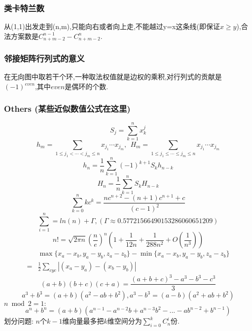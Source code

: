 \begin{small}
\subsubsection{类卡特兰数}
从(1,1)出发走到(n,m),只能向右或者向上走,不能越过y=x这条线(即保证$x\geq y$),合法方案数是$C_{n+m-2}^{n-1} - C_{n+m-2}^n$.

\subsubsection{邻接矩阵行列式的意义}
在无向图中取若干个环,一种取法权值就是边权的乘积,对行列式的贡献是$(-1)^{even}$,其中$even$是偶环的个数.

\subsubsection{Others (某些近似数值公式在这里)}
\[ S_j = \sum_{k=1}^nx_k^j \]
\[ h_m = \sum_{1\leq j_1 < \cdots < j_m \leq n} x_{j_1}\cdots x_{j_m},\ \ H_m = \sum_{1\leq j_1 \leq \cdots \leq j_m \leq n} x_{j_1}\cdots x_{j_m} \]
\[ h_n = \frac{1}{n}\sum_{k=1}^n(-1)^{k+1}S_kh_{n-k} \]
\[ H_n = \frac{1}{n}\sum_{k=1}^nS_kH_{n-k} \]
\[ \sum_{k=0}^nkc^k = \frac{nc^{n+2}-(n+1)c^{n+1}+c}{(c-1)^2} \]
\[ \sum_{i=1}^n=ln(n)+\Gamma,(\Gamma\approx0.57721566490153286060651209)\]
\[ n! = \sqrt{2\pi n}(\frac{n}{e})^n(1+\frac{1}{12n}+\frac{1}{288n^2}+O(\frac{1}{n^3})) \]
\[ \begin{aligned}
 &\max{\{x_a-x_b, y_a-y_b, z_a-z_b\}} - \min{\{x_a-x_b, y_a-y_b, z_a-z_b\}} \\
=& \frac{1}{2}\sum_{cyc}\left| (x_a-y_a)-(x_b-y_b) \right|
\end{aligned} \]
\[ (a+b)(b+c)(c+a) = \frac{(a+b+c)^3 - a^3 - b^3 - c^3}{3} \]
\[ a^3+b^3=(a+b)(a^2-ab+b^2),a^3-b^3=(a-b)(a^2+ab+b^2) \]
$n\bmod 2=1:$
\[ a^n+b^n=(a+b)(a^{n-1}-a^{n-2}b+a^{n-3}b^2-...-ab^{n-2}+b^{n-1})\]
划分问题: $n$个$k-1$维向量最多把$k$维空间分为$\sum_{i=0}^{k}C_n^i$份.
\end{small}